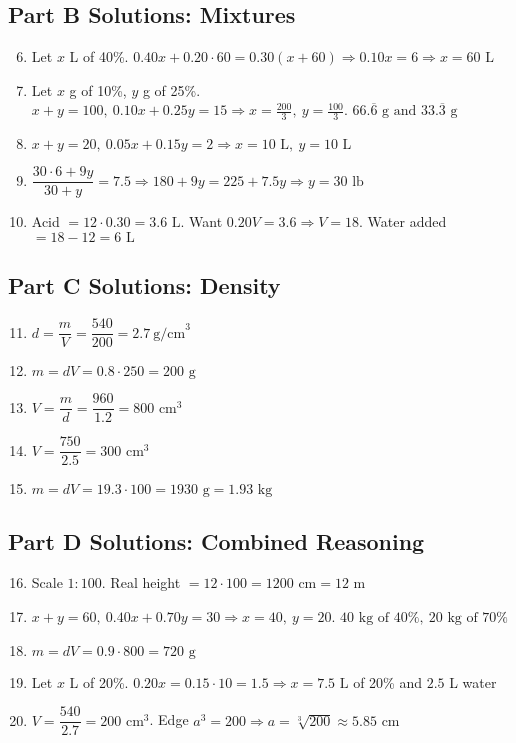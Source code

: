 \documentclass[12pt]{article}
\begin{document}
\subsection*{Part B Solutions: Mixtures}
\begin{enumerate}
  \setcounter{enumi}{5}
  \item Let \(x\) L of 40\%. \(0.40x+0.20\cdot60=0.30(x+60)\Rightarrow 0.10x=6\Rightarrow \boxed{x=60\text{ L}}\)
  \item Let \(x\) g of 10\%, \(y\) g of 25\%. \(x+y=100,\ 0.10x+0.25y=15\Rightarrow x=\tfrac{200}{3},\ y=\tfrac{100}{3}\). \(\boxed{66.\overline{6}\text{ g and }33.\overline{3}\text{ g}}\)
  \item \(x+y=20,\ 0.05x+0.15y=2\Rightarrow \boxed{x=10\text{ L},\ y=10\text{ L}}\)
  \item \(\dfrac{30\cdot6+9y}{30+y}=7.5\Rightarrow 180+9y=225+7.5y\Rightarrow y= \boxed{30\text{ lb}}\)
  \item Acid \(=12\cdot0.30=3.6\text{ L}\). Want \(0.20V=3.6\Rightarrow V=18\). Water added \(=18-12=\boxed{6\text{ L}}\)
\end{enumerate}

\subsection*{Part C Solutions: Density}
\begin{enumerate}
  \setcounter{enumi}{10}
  \item \(d=\dfrac{m}{V}=\dfrac{540}{200}=\boxed{2.7\ \text{g/cm}^3}\)
  \item \(m=dV=0.8\cdot250=\boxed{200\text{ g}}\)
  \item \(V=\dfrac{m}{d}=\dfrac{960}{1.2}=\boxed{800\text{ cm}^3}\)
  \item \(V=\dfrac{750}{2.5}=\boxed{300\text{ cm}^3}\)
  \item \(m=dV=19.3\cdot100=\boxed{1930\text{ g}}=\boxed{1.93\text{ kg}}\)
\end{enumerate}

\subsection*{Part D Solutions: Combined Reasoning}
\begin{enumerate}
  \setcounter{enumi}{15}
  \item Scale \(1:100\). Real height \(=12\cdot100=\boxed{1200\text{ cm}}=\boxed{12\text{ m}}\)
  \item \(x+y=60,\ 0.40x+0.70y=30\Rightarrow x=40,\ y=20\). \(\boxed{40\text{ kg of 40\%},\ 20\text{ kg of 70\%}}\)
  \item \(m=dV=0.9\cdot800=\boxed{720\text{ g}}\)
  \item Let \(x\) L of 20\%. \(0.20x=0.15\cdot10=1.5\Rightarrow x=\boxed{7.5\text{ L}}\) of 20\% and \(2.5\) L water
  \item \(V=\dfrac{540}{2.7}=200\text{ cm}^3\). Edge \(a^3=200\Rightarrow a=\sqrt[3]{200}\approx \boxed{5.85\text{ cm}}\)
\end{enumerate}
\end{document}
